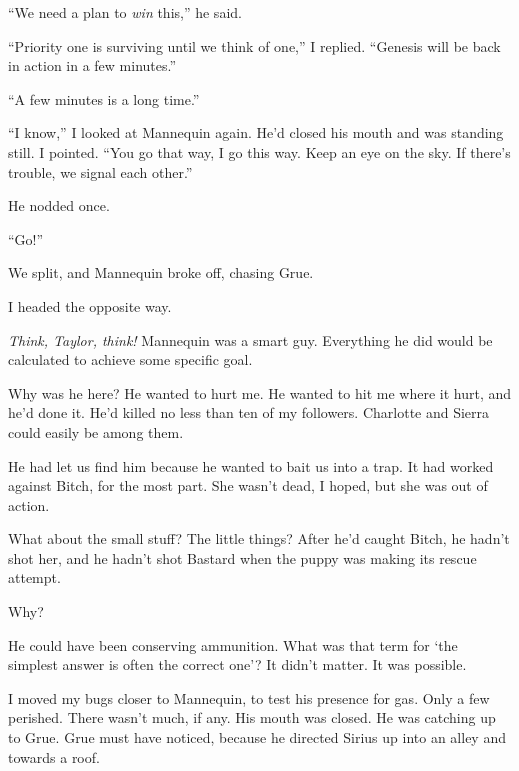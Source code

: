 ``We need a plan to \emph{win} this,'' he said.



``Priority one is surviving until we think of one,'' I replied.  ``Genesis will be back in action in a few minutes.''



``A few minutes is a long time.''



``I know,'' I looked at Mannequin again.  He'd closed his mouth and was standing still.  I pointed.  ``You go that way, I go this way.  Keep an eye on the sky.  If there's trouble, we signal each other.''



He nodded once.



``Go!''



We split, and Mannequin broke off, chasing Grue.



I headed the opposite way.



\emph{Think, Taylor, think!}  Mannequin was a smart guy.  Everything he did would be calculated to achieve some specific goal.



Why was he here?  He wanted to hurt me.  He wanted to hit me where it hurt, and he'd done it.  He'd killed no less than ten of my followers.  Charlotte and Sierra could easily be among them.



He had let us find him because he wanted to bait us into a trap.  It had worked against Bitch, for the most part.  She wasn't dead, I hoped, but she was out of action.



What about the small stuff?  The little things?  After he'd caught Bitch, he hadn't shot her, and he hadn't shot Bastard when the puppy was making its rescue attempt.



Why?



He could have been conserving ammunition.  What was that term for `the simplest answer is often the correct one'?  It didn't matter.  It was possible.



I moved my bugs closer to Mannequin, to test his presence for gas.  Only a few perished.  There wasn't much, if any.  His mouth was closed.  He was catching up to Grue.  Grue must have noticed, because he directed Sirius up into an alley and towards a roof.




